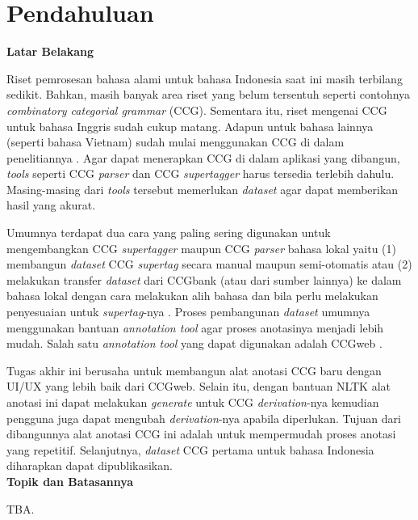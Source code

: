 
\section{Pendahuluan}

\noindent\textbf{Latar Belakang}

Riset pemrosesan bahasa alami untuk bahasa Indonesia saat ini masih terbilang sedikit.
Bahkan, masih banyak area riset yang belum tersentuh seperti contohnya
\textit{combinatory categorial grammar} (CCG).
Sementara itu, riset mengenai CCG untuk bahasa Inggris sudah cukup matang.
Adapun untuk bahasa lainnya (seperti bahasa Vietnam) sudah mulai menggunakan CCG di dalam
penelitiannya \citep{nguyen2019vietnamese}.
Agar dapat menerapkan CCG di dalam aplikasi yang dibangun, \textit{tools} seperti
CCG \textit{parser} dan CCG \textit{supertagger} harus tersedia terlebih dahulu.
Masing-masing dari \textit{tools} tersebut memerlukan \textit{dataset} agar dapat memberikan
hasil yang akurat.

Umumnya terdapat dua cara yang paling sering digunakan untuk mengembangkan CCG \textit{supertagger}
maupun CCG \textit{parser} bahasa lokal yaitu (1) membangun \textit{dataset} CCG \textit{supertag}
secara manual maupun semi-otomatis atau (2) melakukan transfer \textit{dataset} dari CCGbank
(atau dari sumber lainnya) ke dalam bahasa lokal dengan cara melakukan alih bahasa dan bila perlu
melakukan penyesuaian untuk \textit{supertag}-nya \citep{hockenmaier-steedman-2007-ccgbank}.
Proses pembangunan \textit{dataset} umumnya menggunakan bantuan \textit{annotation tool} agar
proses anotasinya menjadi lebih mudah.
Salah satu \textit{annotation tool} yang dapat digunakan adalah
CCGweb \citep{evang-etal-2019-ccgweb}.

Tugas akhir ini berusaha untuk membangun alat anotasi CCG baru dengan
UI/UX yang lebih baik dari CCGweb.
Selain itu, dengan bantuan NLTK alat anotasi ini dapat melakukan \textit{generate} untuk
CCG \textit{derivation}-nya kemudian pengguna juga dapat mengubah \textit{derivation}-nya
apabila diperlukan.
Tujuan dari dibangunnya alat anotasi CCG ini adalah untuk mempermudah proses anotasi yang
repetitif.
Selanjutnya, \textit{dataset} CCG pertama untuk bahasa Indonesia diharapkan dapat dipublikasikan.
\\


\noindent\textbf{Topik dan Batasannya}

TBA.\\

